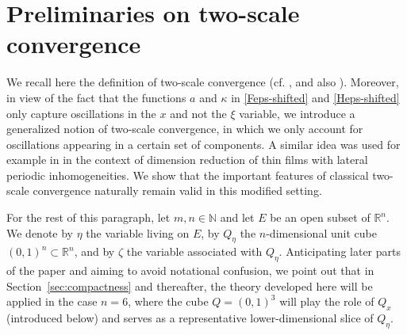 \documentclass[reqno,11pt]{amsart}
\numberwithin{equation}{section}
\theoremstyle{thmlemcorr}
\numberwithin{theorem}{section}
\theoremstyle{thmlemcorr*}
\theoremstyle{defi}
\theoremstyle{remexample}
\theoremstyle{ass}
\newcommand{\N}{\mathbb{N}}
\newcommand{\R}{\mathbb{R}}
\newcommand{\dd}{\,\mathrm{d}}
\newcommand{\1}{\mathds{1}}
\begin{document}





\section{Preliminaries on two-scale convergence}\label{sec:prelim}


We recall here the definition of two-scale convergence (cf. \cite[Definition~1]{LNW02}, and also \cite{Ng89,All92}). Moreover, in view of the fact that the functions \(a\) and  \(\kappa\) in \eqref{Feps-shifted} and \eqref{Heps-shifted} only capture oscillations in the \(x\) and not the \(\xi\) variable, we introduce a generalized notion of two-scale convergence, in which we only account for oscillations appearing in a certain set of components. A similar idea was used for example in \cite{Ne10} in the context of dimension reduction of thin films with lateral periodic inhomogeneities. We show  that the important features of classical two-scale convergence naturally remain valid in this modified setting.

For the rest of this paragraph, let \(m,n\in \N\) and let \(E\) be an open subset of \(\R^n\). We denote by \(\eta\) the variable living on \(E\), by \(Q_\eta\) the \(n\)-dimensional unit cube \((0,1)^n\subset \R^n\), and by \(\zeta\) the variable associated with \(Q_\eta\). Anticipating later parts of the paper and aiming to avoid notational confusion, we point out that in Section~\ref{sec:compactness} and thereafter, the theory developed here will be applied in the case \(n=6\), where the cube \(Q=(0,1)^3\) will play the role of \(Q_x\) (introduced below) and serves as a representative lower-dimensional slice of \(Q_\eta\).
\end{document}
